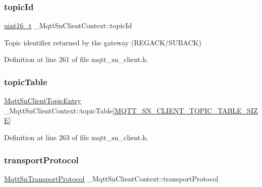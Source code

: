 \mbox{\label{struct__MqttSnClientContext_ad9ac60b5935e7188c14ad6b4a16797ce}} 
\subsubsection{\texorpdfstring{topic\+Id}{topicId}}
{\footnotesize\ttfamily \hyperlink{stdint_8h_a273cf69d639a59973b6019625df33e30}{uint16\+\_\+t} \+\_\+\+Mqtt\+Sn\+Client\+Context\+::topic\+Id}



Topic identifier returned by the gateway (R\+E\+G\+A\+C\+K/\+S\+U\+B\+A\+CK) 



Definition at line 261 of file mqtt\+\_\+sn\+\_\+client.\+h.

\mbox{\label{struct__MqttSnClientContext_a28ff5de9226e93950ca2c860609792ae}} 
\subsubsection{\texorpdfstring{topic\+Table}{topicTable}}
{\footnotesize\ttfamily \hyperlink{structMqttSnClientTopicEntry}{Mqtt\+Sn\+Client\+Topic\+Entry} \+\_\+\+Mqtt\+Sn\+Client\+Context\+::topic\+Table\mbox{[}\hyperlink{mqtt__sn__client_8h_a5b09bca70606bc04d0c7ae24e2319f75}{M\+Q\+T\+T\+\_\+\+S\+N\+\_\+\+C\+L\+I\+E\+N\+T\+\_\+\+T\+O\+P\+I\+C\+\_\+\+T\+A\+B\+L\+E\+\_\+\+S\+I\+ZE}\mbox{]}}



Definition at line 263 of file mqtt\+\_\+sn\+\_\+client.\+h.

\mbox{\label{struct__MqttSnClientContext_a9abf675acfa0c7deda0d772909d49463}} 
\subsubsection{\texorpdfstring{transport\+Protocol}{transportProtocol}}
{\footnotesize\ttfamily \hyperlink{mqtt__sn__common_8h_a253f39a8dfbcfb9062c71a05947121eb}{Mqtt\+Sn\+Transport\+Protocol} \+\_\+\+Mqtt\+Sn\+Client\+Context\+::transport\+Protocol}



